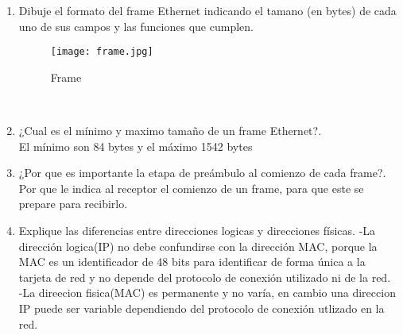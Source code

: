 \documentclass{udparticle}
\begin{document}
\begin{enumerate}
\item Dibuje el formato del frame Ethernet indicando el tamano (en bytes) de cada uno de sus campos
y las funciones que cumplen.\\
\begin{figure}[H]
	\centering
	\texttt{[image: frame.jpg]}
	\caption{Frame}
\end{figure}\\
\item ¿Cual es el mínimo y maximo tamaño de un frame Ethernet?.\\
    El mínimo son 84 bytes y el máximo 1542 bytes
\item ¿Por que es importante la etapa de preámbulo al comienzo de cada frame?.\\
    Por que le indica al receptor el comienzo de un frame, para que este se prepare para recibirlo.
\item Explique las diferencias entre direcciones logicas y direcciones físicas.
    -La dirección logica(IP) no debe confundirse con la dirección MAC, porque la MAC es un identificador de 48 bits para identificar 
    de forma única  a la tarjeta de red y no depende del protocolo de conexión utilizado ni de la red.\\
    -La direecion fisica(MAC) es permanente y no varía, en cambio una direccion IP puede ser variable dependiendo del protocolo
    de conexión utlizado en la red.\\


\end{enumerate}
\end{document}
